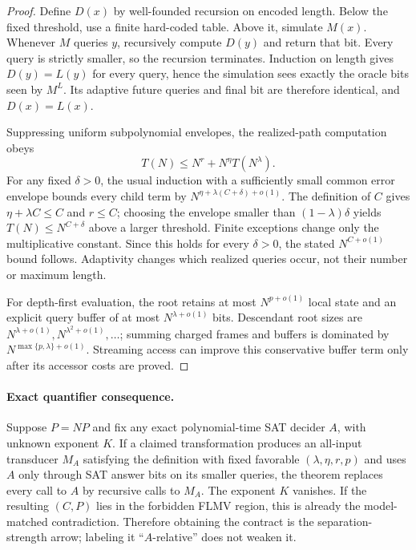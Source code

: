 \documentclass[11pt]{article}
\begin{document}
\begin{proof}
Define $D(x)$ by well-founded recursion on encoded length.  Below the fixed
threshold, use a finite hard-coded table.  Above it, simulate $M(x)$.  Whenever
$M$ queries $y$, recursively compute $D(y)$ and return that bit.  Every query is
strictly smaller, so the recursion terminates.  Induction on length gives
$D(y)=L(y)$ for every query, hence the simulation sees exactly the oracle bits
seen by $M^L$.  Its adaptive future queries and final bit are therefore
identical, and $D(x)=L(x)$.

Suppressing uniform subpolynomial envelopes, the realized-path computation
obeys
\[
 T(N)\le N^r+N^\eta T(N^\lambda).
\]
For any fixed $\delta>0$, the usual induction with a sufficiently small common
error envelope bounds every child term by
$N^{\eta+\lambda(C+\delta)+o(1)}$.  The definition of $C$ gives
$\eta+\lambda C\le C$ and $r\le C$; choosing the envelope smaller than
$(1-\lambda)\delta$ yields $T(N)\le N^{C+\delta}$ above a larger threshold.
Finite exceptions change only the multiplicative constant.  Since this holds
for every $\delta>0$, the stated $N^{C+o(1)}$ bound follows.  Adaptivity changes
which realized queries occur, not their number or maximum length.

For depth-first evaluation, the root retains at most $N^{p+o(1)}$ local state
and an explicit query buffer of at most $N^{\lambda+o(1)}$ bits.  Descendant
root sizes are $N^{\lambda+o(1)},N^{\lambda^2+o(1)},\ldots$; summing charged
frames and buffers is dominated by $N^{\max\{p,\lambda\}+o(1)}$.  Streaming
access can improve this conservative buffer term only after its accessor costs
are proved.
\end{proof}

\paragraph{Exact quantifier consequence.}
Suppose $P=NP$ and fix any exact polynomial-time SAT decider $A$, with unknown
exponent $K$.  If a claimed transformation produces an all-input transducer
$M_A$ satisfying the definition with fixed favorable $(\lambda,\eta,r,p)$ and
uses $A$ only through SAT answer bits on its smaller queries, the theorem
replaces every call to $A$ by recursive calls to $M_A$.  The exponent $K$
vanishes.  If the resulting $(C,P)$ lies in the forbidden FLMV region, this is
already the model-matched contradiction.  Therefore obtaining the contract is
the separation-strength arrow; labeling it ``$A$-relative'' does not weaken it.
\end{document}
